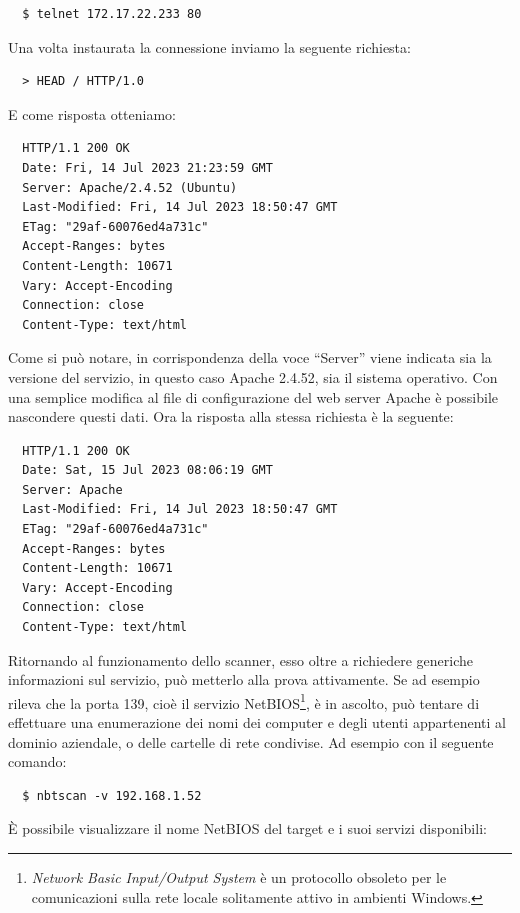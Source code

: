 \documentclass[target=mst,aauheader=]{thud}
\begin{document}
\begin{verbatim}
  $ telnet 172.17.22.233 80
\end{verbatim}

Una volta instaurata la connessione inviamo la seguente richiesta:

\begin{verbatim}
  > HEAD / HTTP/1.0
\end{verbatim}

E come risposta otteniamo:

\begin{verbatim}
  HTTP/1.1 200 OK
  Date: Fri, 14 Jul 2023 21:23:59 GMT
  Server: Apache/2.4.52 (Ubuntu)
  Last-Modified: Fri, 14 Jul 2023 18:50:47 GMT
  ETag: "29af-60076ed4a731c"
  Accept-Ranges: bytes
  Content-Length: 10671
  Vary: Accept-Encoding
  Connection: close
  Content-Type: text/html
\end{verbatim}

Come si può notare, in corrispondenza della voce “Server” viene indicata sia la versione del servizio, in questo caso Apache 2.4.52, sia il sistema operativo. Con una semplice modifica al file di configurazione del web server Apache è possibile nascondere questi dati. Ora la risposta alla stessa richiesta è la seguente:

\begin{verbatim}
  HTTP/1.1 200 OK
  Date: Sat, 15 Jul 2023 08:06:19 GMT
  Server: Apache
  Last-Modified: Fri, 14 Jul 2023 18:50:47 GMT
  ETag: "29af-60076ed4a731c"
  Accept-Ranges: bytes
  Content-Length: 10671
  Vary: Accept-Encoding
  Connection: close
  Content-Type: text/html
\end{verbatim}

Ritornando al funzionamento dello scanner, esso oltre a richiedere generiche informazioni sul servizio, può metterlo alla prova attivamente. Se ad esempio rileva che la porta 139, cioè il servizio NetBIOS\footnote{\textit{Network Basic Input/Output System} è un protocollo obsoleto per le comunicazioni sulla rete locale solitamente attivo in ambienti Windows.}, è in ascolto, può tentare di effettuare una enumerazione dei nomi dei computer e degli utenti appartenenti al dominio aziendale, o delle cartelle di rete condivise. Ad esempio con il seguente comando:

\begin{verbatim}
  $ nbtscan -v 192.168.1.52
\end{verbatim}

È possibile visualizzare il nome NetBIOS del target e i suoi servizi disponibili:
\end{document}
